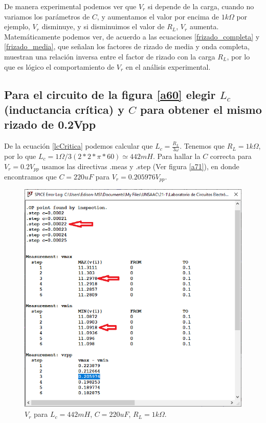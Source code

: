 \documentclass[a4paper]{IEEEtran} %
\begin{document}
De manera experimental podemos ver que $V_r$ si depende de la carga, cuando no variamos los parámetros de $C$, y aumentamos el valor por encima de $1k\Omega$ por ejemplo, $V_r$ disminuye, y si disminuimos el valor de $R_L$, $V_r$ aumenta.
Matemáticamente podemos ver, de acuerdo a las ecuaciones \eqref{frizado_completa} y \eqref{frizado_media}, que señalan los factores de rizado de media y onda completa, muestran una relación inversa entre el factor de rizado con la carga $R_L$, por lo que es lógico el comportamiento de $V_r$ en el análisis experimental.


\subsection{Para el circuito de la figura \eqref{a60} elegir $L_c$ (inductancia crítica) y $C$ para obtener el mismo rizado de 0.2Vpp}

De la ecuación \eqref{lcCritica} podemos calcular que $L_c = \frac{R_L}{3\omega}$. Tenemos que $R_L = 1k\Omega$, por lo que $L_c = 1\Omega / 3(2*2*\pi*60) \simeq 442mH$. Para hallar la $C$ correcta para $V_r = 0.2V_{pp}$ usamos las directivas .meas y .step (Ver figura \eqref{a71}), en donde encontramos que $C= 220uF$ para $V_r = 0.205976V_{pp}$.

\begin{figure}[!h]
	\centering
	\includegraphics[scale=0.5]{IMAGENES/a71}
	\caption{$V_r$ para $L_c = 442mH$, $C = 220uF$, $R_L = 1k\Omega$.}
	\label{a71}
\end{figure}
\end{document}
